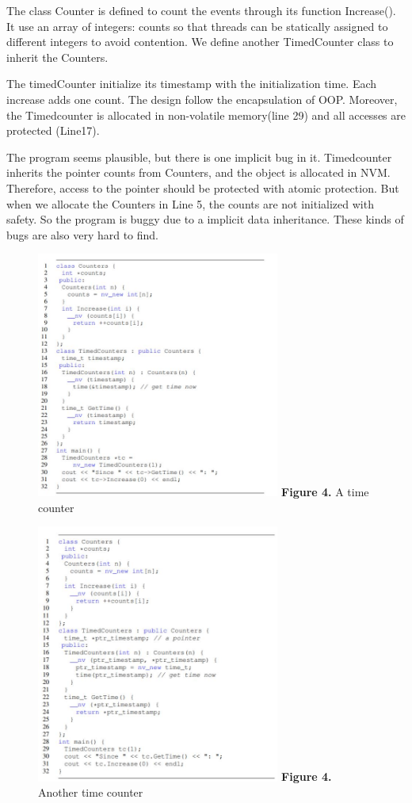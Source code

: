 \documentclass{sig-alternate}
\begin{document}
The class Counter is defined to count the events through its function Increase(). It use an array of integers: counts so that threads can be statically assigned to different integers to avoid contention. We define another TimedCounter class to inherit the Counters.

The timedCounter initialize its timestamp with the initialization time. Each increase adds one count. The design follow the encapsulation of OOP. Moreover, the Timedcounter is allocated in non-volatile memory(line 29) and all accesses are protected (Line17).

The program seems plausible, but there is one implicit bug in it. Timedcounter inherits the pointer counts from Counters, and the object is allocated in NVM. Therefore, access to the pointer should be protected with atomic protection. But when we allocate the Counters in Line 5, the counts are not initialized with safety. So the program is buggy due to a implicit data inheritance. These kinds of bugs are also very hard to find.


\begin{figure}
\includegraphics[width=8cm]{error2}
\textbf{Figure 4.} A time counter
\end{figure}


\begin{figure}

\includegraphics[width=8cm]{error3}
\textbf{Figure 4.} Another time counter
\end{figure}
\end{document}
